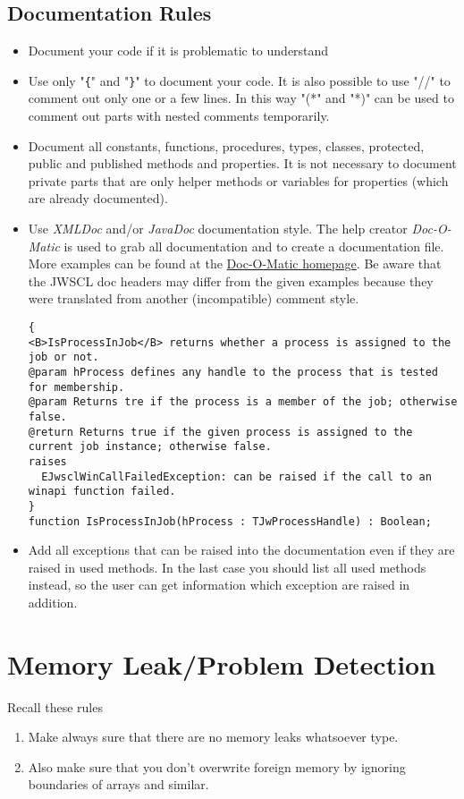 \documentclass[a4paper,oneside,10pt]{article}
\begin{document}
\subsection{Documentation Rules}
\begin{itemize}
	\item Document your code if it is problematic to understand
	\item Use only "\verb#{#" and "\verb#}#" to document your code. It is also possible to use "//" to comment out only one or a few lines. In this way "(*" and "*)" can be used to comment out parts with nested comments temporarily.
	\item Document all constants, functions, procedures, types, classes, protected, public and published methods and properties. It is not necessary to document private parts that are only helper methods or variables for properties (which are already documented).
	\item Use \textit{XMLDoc} and/or \textit{JavaDoc} documentation style. The help creator \textit{Doc-O-Matic} is used to grab all documentation and to create a documentation file.\\
More examples can be found at the \href{http://www.doc-o-matic.com/examplesourcecode.html}{Doc-O-Matic homepage}.
Be aware that the JWSCL doc headers may differ from the given examples because they were translated from another (incompatible) comment style.
\begin{lstlisting}  
{
<B>IsProcessInJob</B> returns whether a process is assigned to the job or not.
@param hProcess defines any handle to the process that is tested for membership.
@param Returns tre if the process is a member of the job; otherwise false.
@return Returns true if the given process is assigned to the current job instance; otherwise false.
raises
  EJwsclWinCallFailedException: can be raised if the call to an winapi function failed.
}
function IsProcessInJob(hProcess : TJwProcessHandle) : Boolean;
\end{lstlisting}

\item Add all exceptions that can be raised into the documentation even if they are raised in used methods. In the last case you should list all used methods instead, so the user can get information which exception are raised in addition.

\end{itemize}


\section{Memory Leak/Problem Detection}
Recall these rules
\begin{enumerate}
  \item Make always sure that there are no memory leaks whatsoever type. 
  \item Also make sure that you don't overwrite foreign memory by ignoring boundaries of arrays and similar.
\end{enumerate}
\end{document}
